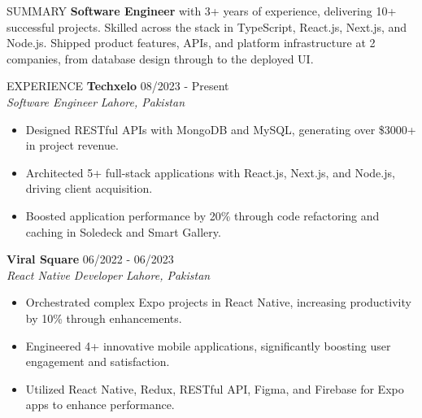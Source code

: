 \documentclass{resume}
\begin{document}
\begin{rSection}{SUMMARY}
\textbf{Software Engineer} with 3+ years of experience, delivering 10+ successful projects. Skilled across the stack in TypeScript, React.js, Next.js, and Node.js. Shipped product features, APIs, and platform infrastructure at 2 companies, from database design through to the deployed UI.
\end{rSection}
\begin{rSection}{EXPERIENCE}
\textbf{Techxelo} \hfill 08/2023 - Present \\
\textit{Software Engineer}  \hfill \textit{Lahore, Pakistan}
\begin{itemize}
\itemsep -3pt {}
\item Designed RESTful APIs with MongoDB and MySQL, generating over \$3000+ in project revenue.
\item Architected 5+ full-stack applications with React.js, Next.js, and Node.js, driving client acquisition.
\item Boosted application performance by 20\% through code refactoring and caching in Soledeck and Smart Gallery.
\end{itemize}
\textbf{Viral Square} \hfill 06/2022 - 06/2023 \\
\textit{React Native Developer} \hfill \textit{Lahore, Pakistan}
\begin{itemize}
\itemsep -3pt {}
\item Orchestrated complex Expo projects in React Native, increasing productivity by 10\% through enhancements.
\item Engineered 4+ innovative mobile applications, significantly boosting user engagement and satisfaction.
\item Utilized React Native, Redux, RESTful API, Figma, and Firebase for Expo apps to enhance performance.
\end{itemize}
\end{rSection}
\end{document}
